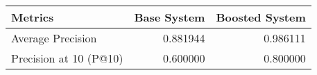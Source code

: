 \begin{tabular}{lrr}
\toprule
               Metrics &  Base System &  Boosted System \\
\midrule
     Average Precision &     0.881944 &        0.986111 \\
Precision at 10 (P@10) &     0.600000 &        0.800000 \\
\bottomrule
\end{tabular}
